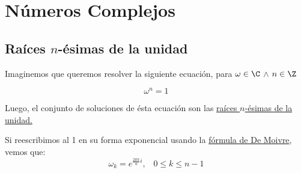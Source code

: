 \documentclass[../main.tex]{subfiles}
\begin{document}
\section{Números Complejos}
\subsection{Raíces $n$-ésimas de la unidad} {
    Imaginemos que queremos resolver la siguiente ecuación, para $\omega \in \C$ $\land$ $n \in \Z$
    
    \begin{equation}
        \omega^n = 1
    \end{equation}
    
    Luego, el conjunto de soluciones de ésta ecuación son las \ul{raíces $n$-ésimas de la unidad.}
    
    Si reescribimos al 1 en su forma exponencial usando la \hyperref[moivre]{fórmula de De Moivre}, vemos que:
    \begin{equation}
        \omega_k = e^{\frac{2k\pi}{n}i}, \;\;\; 0 \leq k \leq n-1
    \end{equation}
    
}
\end{document}
